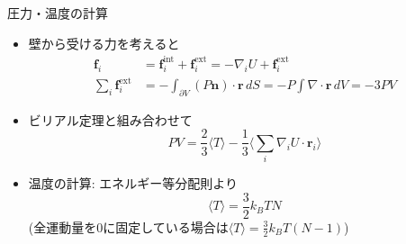 
\begin{frame}[t,fragile]{圧力・温度の計算}
  \begin{itemize}
  \item 壁から受ける力を考えると
    \begin{align*}
      \mathbf{f}_i &= \mathbf{f}_i^\text{int} + \mathbf{f}_i^\text{ext} = -\nabla_i U + \mathbf{f}_i^\text{ext} \\
      \sum_i \mathbf{f}_i^\text{ext} &= - \int_{\partial V} (P \mathbf{n}) \cdot \mathbf{r} \, dS = - P \int \nabla \cdot \mathbf{r} \, dV = -3PV
    \end{align*}
  \item ビリアル定理と組み合わせて
    \[
    PV = \frac{2}{3} \langle T \rangle -\frac{1}{3} \langle \sum_i \nabla_i U \cdot \mathbf{r}_i \rangle
    \]
  \item 温度の計算: エネルギー等分配則より
    \[
    \langle T \rangle = \frac{3}{2} k_B T N
    \]
    (全運動量を0に固定している場合は$\langle T \rangle = \frac{3}{2} k_B T (N-1)$)
  \end{itemize}
\end{frame}
